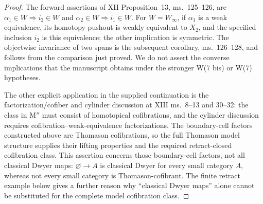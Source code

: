 \documentclass[11pt,a4paper]{article}
\theoremstyle{definition}
\theoremstyle{remark}
\begin{document}
\begin{proof}
The forward assertions of XII Proposition~13, ms.~125--126, are $\alpha_1\in W\Rightarrow i_2\in W$ and $\alpha_2\in W\Rightarrow i_1\in W$. For $W=W_\infty$, if $\alpha_1$ is a weak equivalence, its homotopy pushout is weakly equivalent to $X_2$, and the specified inclusion $i_2$ is this equivalence; the other implication is symmetric. The objectwise invariance of two spans is the subsequent corollary, ms.~126--128, and follows from the comparison just proved. We do not assert the converse implications that the manuscript obtains under the stronger W(7 bis) or W(7) hypotheses.

The other explicit application in the supplied continuation is the factorization/cofiber and cylinder discussion at XIII ms.~8--13 and 30--32: the class in M$''$ must consist of homotopical cofibrations, and the cylinder discussion requires cofibration--weak-equivalence factorizations. The boundary-cell factors constructed above are Thomason cofibrations, so the full Thomason model structure supplies their lifting properties and the required retract-closed cofibration class. This assertion concerns those boundary-cell factors, not all classical Dwyer maps: $\varnothing\to A$ is classical Dwyer for every small category $A$, whereas not every small category is Thomason-cofibrant. The finite retract example below gives a further reason why ``classical Dwyer maps'' alone cannot be substituted for the complete model cofibration class.
\end{proof}
\end{document}
